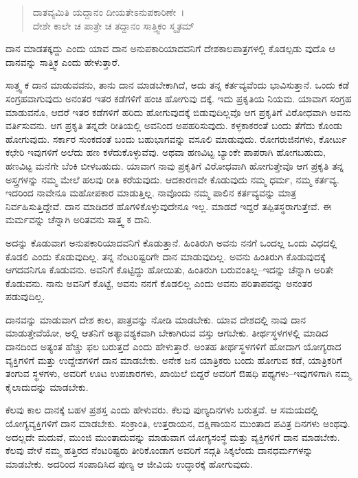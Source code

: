 \begin{verse}
ದಾತವ್ಯಮಿತಿ ಯದ್ದಾನಂ ದೀಯತೇಽನುಪಕಾರಿಣೇ~।\\ದೇಶೇ ಕಾಲೇ ಚ ಪಾತ್ರೇ ಚ ತದ್ದಾನಂ ಸಾತ್ತ್ವಿಕಂ ಸ್ಮೃತಮ್ 
\end{verse}

{\small ದಾನ ಮಾಡತಕ್ಕದ್ದು ಎಂದು ಯಾವ ದಾನ ಅನುಪಕಾರಿಯಾದವನಿಗೆ ದೇಶಕಾಲಪಾತ್ರಗಳಲ್ಲಿ ಕೊಡಲ್ಪಡು ವುದೊ ಆ ದಾನವನ್ನು ಸಾತ್ತ್ವಿಕ ಎಂದು ಹೇಳುತ್ತಾರೆ.}

ಸಾತ್ತ್ವ ಕ ದಾನ ಮಾಡುವವನು, ತಾನು ದಾನ ಮಾಡಬೇಕಾಗಿದೆ, ಅದು ತನ್ನ ಕರ್ತವ್ಯವೆಂದು ಭಾವಿಸುತ್ತಾನೆ. ಒಂದು ಕಡೆ ಸಂಗ್ರಹವಾಗುವುದು ಅನಂತರ ಇತರ ಕಡೆಗಳಿಗೆ ಹಂಚಿ ಹೋಗುವು ದಕ್ಕೆ. ಇದು ಪ್ರಕೃತಿಯ ನಿಯಮ. ಯಾವಾಗ ಸಂಗ್ರಹ ಮಾಡುವನೊ, ಆದರೆ ಇತರ ಕಡೆಗಳಿಗೆ ಹರಿದು ಹೋಗುವುದಕ್ಕೆ ಬಿಡುವುದಿಲ್ಲವೊ ಆಗ ಪ್ರಕೃತಿಗೆ ವಿರೋಧವಾಗಿ ಅವನು ವರ್ತಿಸುವನು. ಆಗ ಪ್ರಕೃತಿ ತನ್ನದೇ ರೀತಿಯಲ್ಲಿ ಅವನಿಂದ ಅಪಹರಿಸುವುದು. ಕಳ್ಳಕಾಕರಂತೆ ಬಂದು ತೆಗೆದು ಕೊಂಡು ಹೋಗುವುದು. ಸರ್ಕಾರ ಸುಂಕದಂತೆ ಬಂದು ಬಹುಭಾಗವನ್ನು ವಸೂಲಿ ಮಾಡುವುದು. ರೋಗರುಜಿನಗಳು, ಕೋರ್ಟು ಕಛೇರಿ ಇವುಗಳಿಗೆ ಅಲೆದು ಹಣ ಕಳೆದುಕೊಳ್ಳುವೆವು. ಅಥವಾ ಹಣವಿಟ್ಟ ಬ್ಯಾಂಕೇ ಪಾಪರಾಗಿ ಹೋಗಬಹುದು, ಹಣವಿಟ್ಟ ಮನೆಗೇ ಬೆಂಕಿ ಬೀಳಬಹುದು. ಯಾವಾಗ ನಾವು ಪ್ರಕೃತಿಗೆ ವಿರೋಧವಾಗಿ ಹೋಗುತ್ತೇವೊ ಆಗ ಪ್ರಕೃತಿ ತನ್ನ ಅಸ್ತ್ರಗಳನ್ನು ನಮ್ಮ ಮೇಲೆ ಹಲವು ರೀತಿ ಕರೆಯವುದು. ಆದಕಾರಣವೇ ಕೊಡುವುದು ನಮ್ಮ ಧರ್ಮ, ನಮ್ಮ ಕರ್ತವ್ಯ. ಇದರಿಂದ ನಾವೇನೂ ಮಹೋಪಕಾರ ಮಾಡುತ್ತಿಲ್ಲ. ನಾವೊಂದು ನಮ್ಮ ಪಾಲಿನ ಕರ್ತವ್ಯವನ್ನು ಮಾತ್ರ ನಿರ್ವಹಿಸುತ್ತಿದ್ದೇವೆ. ದಾನ ಮಾಡಿದರೆ ಹೊಗಳಿಕೊಳ್ಳುವುದೇನೂ ಇಲ್ಲ. ಮಾಡದೆ ಇದ್ದರೆ ತಪ್ಪಿತಸ್ಥರಾಗುತ್ತೇವೆ. ಈ ಮರ್ಮವನ್ನು ಚೆನ್ನಾಗಿ ಅರಿತವನು ಸಾತ್ತ್ವ ಕ ದಾನಿ.

ಅದನ್ನು ಕೊಡುವಾಗ ಅನುಪಕಾರಿಯಾದವನಿಗೆ ಕೊಡುತ್ತಾನೆ. ಹಿಂತಿರುಗಿ ಅವನು ನನಗೆ ಒಂದಲ್ಲ ಒಂದು ವಿಧದಲ್ಲಿ ಕೊಡಲಿ ಎಂದು ಕೊಡುವುದಿಲ್ಲ. ತನ್ನ ನೆಂಟರಿಷ್ಟರಿಗೇ ದಾನ ಮಾಡುವುದಿಲ್ಲ. ಅವನು ಹಿಂತಿರುಗಿ ಕೊಡುವುದಕ್ಕೆ ಆಗದವನಿಗೂ ಕೊಡುವನು. ಅವನಿಗೆ ಕೊಟ್ಟಿದ್ದು ಹೋಯಿತು, ಹಿಂತಿರುಗಿ ಬರುವಂತಿಲ್ಲ–ಇದನ್ನು ಚೆನ್ನಾಗಿ ಅರಿತೇ ಕೊಡುವನು. ನಾನು ಅವನಿಗೆ ಕೊಟ್ಟೆ, ಅವನು ನನಗೆ ಕೊಡಲಿಲ್ಲ ಎಂದು ಅವನು ಪರಿತಾಪವನ್ನು ಅನಂತರ ಪಡುವುದಿಲ್ಲ.

ದಾನವನ್ನು ಮಾಡುವಾಗ ದೇಶ ಕಾಲ, ಪಾತ್ರವನ್ನು ನೋಡಿ ಮಾಡಬೇಕು. ಯಾವ ದೇಶದಲ್ಲಿ ನಾವು ದಾನ ಮಾಡುತ್ತೇವೆಯೋ, ಅಲ್ಲಿ ಆತನಿಗೆ ಅತ್ಯಾವಶ್ಯಕವಾಗಿ ಬೇಕಾಗಿರುವ ವಸ್ತು ಆಗಬೇಕು. ತೀರ್ಥಸ್ಥಳಗಳಲ್ಲಿ ಮಾಡಿದ ದಾನದಿಂದ ಅತ್ಯಂತ ಹೆಚ್ಚು ಫಲ ಬರುತ್ತದೆ ಎಂದು ಹೇಳುತ್ತಾರೆ. ಅಂತಹ ತೀರ್ಥಸ್ಥಳಗಳಿಗೆ ಹೋದಾಗ ಯೋಗ್ಯರಾದ ವ್ಯಕ್ತಿಗಳಿಗೆ ಮತ್ತು ಉದ್ದೇಶಗಳಿಗೆ ದಾನ ಮಾಡಬೇಕು. ಅನೇಕ ಜನ ಯಾತ್ರಿಕರು ಬಂದು ಹೋಗುವ ಕಡೆ, ಯಾತ್ರಿಕರಿಗೆ ತಂಗುವ ಸ್ಥಳಗಳು, ಅವರಿಗೆ ಊಟ ಉಪಚಾರಗಳು, ಖಾಯಿಲೆ ಬಿದ್ದರೆ ಅವರಿಗೆ ಔಷಧಿ ಪಥ್ಯಗಳು–ಇವುಗಳಿಗಾಗಿ ನಮ್ಮ ಕೈಲಾದುದನ್ನು ಮಾಡಬೇಕು.

ಕೆಲವು ಕಾಲ ದಾನಕ್ಕೆ ಬಹಳ ಪ್ರಶಸ್ತ ಎಂದು ಹೇಳುವರು. ಕೆಲವು ಪುಣ್ಯದಿನಗಳು ಬರುತ್ತವೆ. ಆ ಸಮಯದಲ್ಲಿ ಯೋಗ್ಯವ್ಯಕ್ತಿಗಳಿಗೆ ದಾನ ಮಾಡಬೇಕು. ಸಂಕ್ರಾಂತಿ, ಉತ್ತರಾಯನ, ದಕ್ಷಿಣಾಯನ ಮುಂತಾದ ಪವಿತ್ರ ದಿನಗಳು ಅಂಥವು. ಅದಲ್ಲದೇ ಮದುವೆ, ಮುಂಜಿ ಮುಂತಾದುವನ್ನು ಮಾಡುವಾಗ ಯೋಗ್ಯಸಂಸ್ಥೆ ಮತ್ತು ವ್ಯಕ್ತಿಗಳಿಗೆ ದಾನ ಮಾಡಬೇಕು. ಕೆಲವು ವೇಳೆ ನಮ್ಮ ಹತ್ತಿರದ ನೆಂಟರಿಷ್ಟರು ತೀರಿಕೊಂಡಾಗ ಅವರಿಗೆ ಸದ್ಗತಿ ಸಿಕ್ಕಲೆಂದು ದಾನಧರ್ಮಗಳನ್ನು ಮಾಡಬೇಕು. ಅದರಿಂದ ಸಂಪಾದಿಸಿದ ಪುಣ್ಯ ಆ ಜೀವಿಯ ಉದ್ಧಾರಕ್ಕೆ ಹೋಗುವುದು.

